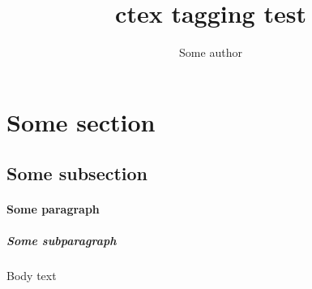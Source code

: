\documentclass[fontset=none]{ctexart}
\title{ctex tagging test}
\author{Some author}
\begin{document}
\maketitle
\tableofcontents
\section{Some section}
\subsection{Some subsection}
\paragraph{Some paragraph}
\subparagraph{Some subparagraph}
Body text

\CTeX
\end{document}
